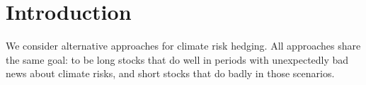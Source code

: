 \chapter{Introduction}

We consider alternative approaches for climate risk hedging. 
All approaches share the same goal: to be long stocks that do well 
in periods with unexpectedly bad news about climate risks, and short 
stocks that do badly in those scenarios. 